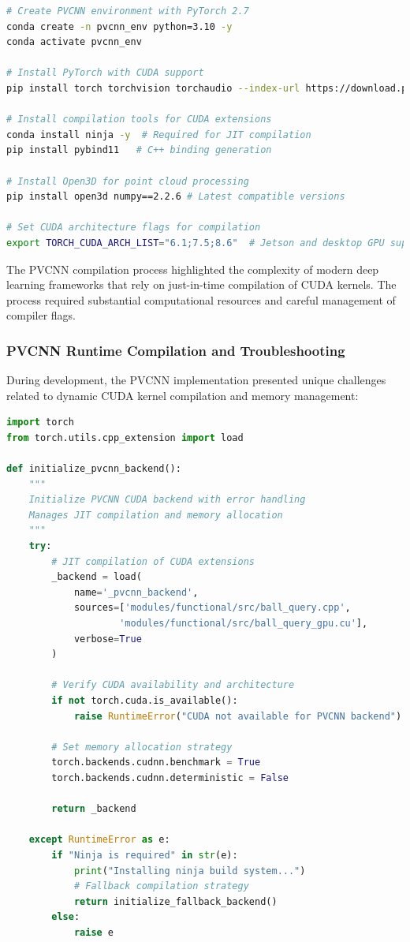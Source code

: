 \documentclass[12pt,a4paper]{report}
\begin{document}
\begin{lstlisting}[caption=PVCNN Environment Setup with CUDA Extensions, label=lst:pvcnn_setup, language=bash]
# Create PVCNN environment with PyTorch 2.7
conda create -n pvcnn_env python=3.10 -y
conda activate pvcnn_env

# Install PyTorch with CUDA support
pip install torch torchvision torchaudio --index-url https://download.pytorch.org/whl/cu124

# Install compilation tools for CUDA extensions
conda install ninja -y  # Required for JIT compilation
pip install pybind11   # C++ binding generation

# Install Open3D for point cloud processing
pip install open3d numpy==2.2.6 # Latest compatible versions

# Set CUDA architecture flags for compilation
export TORCH_CUDA_ARCH_LIST="6.1;7.5;8.6"  # Jetson and desktop GPU support
\end{lstlisting}

The PVCNN compilation process highlighted the complexity of modern deep learning frameworks that rely on just-in-time compilation of CUDA kernels. The process required substantial computational resources and careful management of compiler flags.

\subsubsection{PVCNN Runtime Compilation and Troubleshooting}

During development, the PVCNN implementation presented unique challenges related to dynamic CUDA kernel compilation and memory management:

\begin{lstlisting}[caption=PVCNN CUDA Extension Runtime Handling, label=lst:pvcnn_runtime, language=python]
import torch
from torch.utils.cpp_extension import load

def initialize_pvcnn_backend():
    """
    Initialize PVCNN CUDA backend with error handling
    Manages JIT compilation and memory allocation
    """
    try:
        # JIT compilation of CUDA extensions
        _backend = load(
            name='_pvcnn_backend',
            sources=['modules/functional/src/ball_query.cpp',
                    'modules/functional/src/ball_query_gpu.cu'],
            verbose=True
        )
        
        # Verify CUDA availability and architecture
        if not torch.cuda.is_available():
            raise RuntimeError("CUDA not available for PVCNN backend")
            
        # Set memory allocation strategy
        torch.backends.cudnn.benchmark = True
        torch.backends.cudnn.deterministic = False
        
        return _backend
        
    except RuntimeError as e:
        if "Ninja is required" in str(e):
            print("Installing ninja build system...")
            # Fallback compilation strategy
            return initialize_fallback_backend()
        else:
            raise e
\end{lstlisting}
\end{document}
